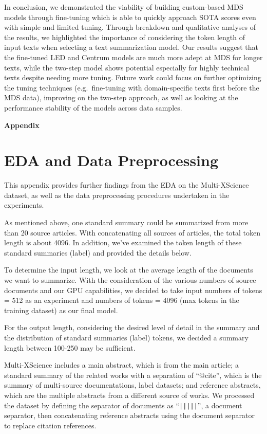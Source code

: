 \documentclass[12pt, twocolumn]{article}
\numberwithin{equation}{section}
\begin{document}
In conclusion, we demonstrated the viability of building custom-based MDS models through fine-tuning which is able to quickly approach SOTA scores even with simple and limited tuning.  Through breakdown and qualitative analyses of the results, we highlighted the importance of considering the token length of input texts when selecting a text summarization model. Our results suggest that the fine-tuned LED and Centrum models are much more adept at MDS for longer texts, while the two-step model shows potential especially for highly technical texts despite needing more tuning. Future work could focus on further optimizing the tuning techniques (e.g.~fine-tuning with domain-specific texts first before the MDS data), improving on the two-step approach, as well as looking at the performance stability of the models across data samples.

\newpage
\hspace{1em}
\newpage
\textbf{\Huge Appendix}
\appendix

\section{EDA and Data Preprocessing}
\label{app:eda}

This appendix provides further findings from the EDA on the Multi-XScience dataset, as well as the data preprocessing procedures undertaken in the experiments.

As mentioned above, one standard summary could be summarized from more than 20 source articles.  With concatenating all sources of articles, the total token length is about 4096. In addition, we've examined the token length of these standard summaries (label) and provided the details below. 

To determine the input length, we look at the average length of the documents we want to summarize. With the consideration of the various numbers of source documents and our GPU capabilities, we decided to take input numbers of tokens = 512 as an experiment and numbers of tokens = 4096 (max tokens in the training dataset) as our final model. 

For the output length, considering the desired level of detail in the summary and the distribution of standard summaries (label) tokens, we decided a summary length between 100-250 may be sufficient. 

Multi-XScience includes a main abstract, which is from the main article; a standard summary of the related works with a separation of ``@cite'', which is the summary of multi-source documentations, label datasets; and reference abstracts, which are the multiple abstracts from a different source of works. We processed the dataset by defining the separator of documents as ``\texttt{|||||}'', a document separator, then concatenating reference abstracts using the document separator to replace citation references. 
\end{document}
